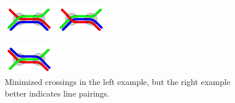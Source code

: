 \documentclass[format=acmsmall, review=false, screen=true]{acmart}
\begin{document}
\begin{figure}[t]
\centering
\begin{minipage}{.48\textwidth}
  \centering
  \includegraphics[trim={2.25 2.2 2.25 2.2},clip,width=.45\textwidth]{figures/render_examples/splitting_example_nonopt.pdf}\hfill
  \includegraphics[trim={2.25 2.2 2.25 2.2},clip,width=.45\textwidth]{figures/render_examples/splitting_example.pdf}
  \caption{Minimized crossings in the left example, but the right example better indicates line pairings.}
  \label{FIG:linesplitting}
\end{minipage}%
\hfill
\begin{minipage}{.48\textwidth}
  \centering
  \includegraphics[trim={2.25 2.2 2.25 2.2},clip,width=.45\textwidth]{figures/render_examples/splitting_example2_nonopt.pdf}\hfill

\end{minipage}
\end{figure}
\end{document}

